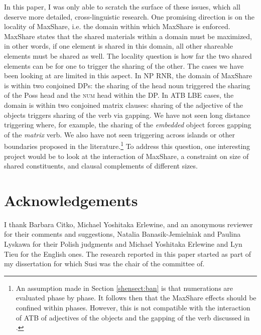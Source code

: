 \documentclass[output=paper]{langscibook}
\begin{document}
In this paper, I was only able to scratch the surface of these issues, which all deserve more detailed, cross-linguistic research. One promising direction is on the locality of MaxShare, i.e. the domain within which MaxShare is enforced. MaxShare states that the shared materials within a domain must be maximized, in other words, if one element is shared in this domain, all other shareable elements must be shared as well.  The locality question is how far the two shared elements can be for one to trigger the sharing of the other. The cases we have been looking at are limited in this aspect. In NP RNR, the domain of MaxShare is within two conjoined DPs: the sharing of the head noun triggered the sharing of the Poss head and the \textsc{num} head within the DP. In ATB LBE cases, the domain is within two conjoined matrix clauses: sharing of the adjective of the objects triggers sharing of the verb via gapping. We have not seen long distance triggering where, for example, the sharing of the \textit{embedded} object forces gapping of the \textit{matrix} verb. We also have not seen triggering across islands or other boundaries proposed in the literature.\footnote{An assumption made in Section \ref{shensect:ban} is that numerations are evaluated phase by phase. It follows then that the MaxShare effects should be confined within phases. However, this is not compatible with the interaction of ATB of adjectives of the objects and the gapping of the verb discussed in \citet{Citko:2006}.} To address this question, one interesting project would be to look at the interaction of MaxShare, a constraint on size of shared constituents, and clausal complements of different sizes. 

\section*{Acknowledgements}

\begin{sloppypar}
I thank Barbara Citko, Michael Yoshitaka Erlewine, and an anonymous reviewer for their comments and suggestions, Natalia Banasik-Jemielniak and Paulina Lyskawa for their Polish judgments and Michael Yoshitaka Erlewine and Lyn Tieu for the English ones. The research reported in this paper started as part of my dissertation for which Susi was the chair of the committee of. 
\end{sloppypar}


{\sloppy\printbibliography[heading=subbibliography,notkeyword=this]}
\end{document}
